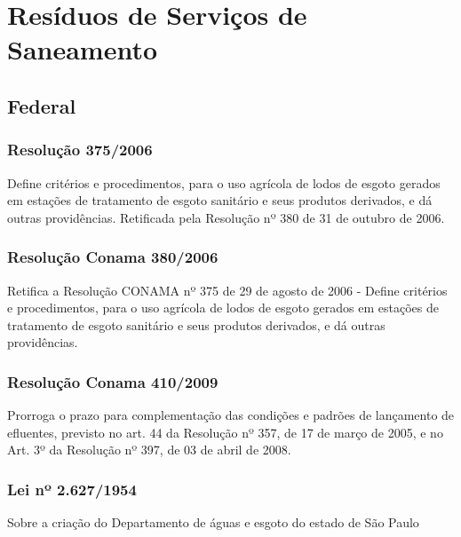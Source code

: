 \section{Resíduos de Serviços de Saneamento}

\begin{subapend}
	\subsection{Federal}
	\begin{subsubapend}
		\item \subsubsection{Resolução 375/2006}
		Define critérios e procedimentos, para o uso agrícola de lodos de esgoto gerados em estações de tratamento de esgoto sanitário e seus produtos derivados, e dá outras providências. Retificada pela Resolução nº 380 de 31 de outubro de 2006.
		\subsubsection{Resolução Conama 380/2006}
		Retifica a Resolução CONAMA nº 375 de 29 de agosto de 2006 - Define critérios e procedimentos, para o uso agrícola de lodos de esgoto gerados em estações de tratamento de esgoto sanitário e seus produtos derivados, e dá outras providências.
		\subsubsection{Resolução Conama 410/2009}
		Prorroga o prazo para complementação das condições e padrões de lançamento de efluentes, previsto no art. 44 da Resolução nº 357, de 17 de março de 2005, e no Art. 3º da Resolução nº 397, de 03 de abril de 2008.
		\subsubsection{Lei nº 2.627/1954}
		Sobre a criação do Departamento de águas e esgoto do estado de São Paulo
	\end{subsubapend}
\end{subapend}

